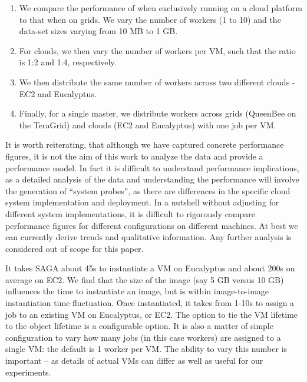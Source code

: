 \documentclass[3p,twocolumn]{elsarticle}
\begin{document}
\begin{enumerate}

 \item We compare the performance of \sagamapreduce when exclusively
 running on a cloud platform to that when on grids. We vary the number
 of workers (1 to 10) and the data-set sizes varying from 10 MB to 1 GB.

 \item For clouds, we then vary the number of workers per VM, such
 that the ratio is 1:2 and 1:4, respectively.

 \item We then distribute the same number of workers across two
 different clouds - EC2 and Eucalyptus.

 \item Finally, for a single master, we distribute workers across
 grids (QueenBee on the TeraGrid) and clouds (EC2 and Eucalyptus) with
 one job per VM.

\end{enumerate}

It is worth reiterating, that although we have captured concrete
performance figures, it is not the aim of this work to analyze the
data and provide a performance model. In fact it is difficult to
understand performance implications, as a detailed analysis of the
data and understanding the performance will involve the generation of
``system probes'', as there are differences in the specific cloud
system implementation and deployment.  In a nutshell without adjusting
for different system implementations, it is difficult to rigorously
compare performance figures for different configurations on different
machines. At best we can currently derive trends and qualitative
information.  Any further analysis is considered out of scope for this
paper.

It takes SAGA about 45s to instantiate a VM on Eucalyptus and about
200s on average on EC2.  We find that the size of the image (say 5 GB
versus 10 GB) influences the time to instantiate an image, but is
within image-to-image instantiation time fluctuation.  Once
instantiated, it takes from 1-10s to assign a job to an existing VM on
Eucalyptus, or EC2.  The option to tie the VM lifetime to the
 object lifetime is a configurable option.  It
is also a matter of simple configuration to vary how many jobs (in
this case workers) are assigned to a single VM:  the default is 1
worker per VM.  The ability to vary this number is important -- as
details of actual VMs can differ as well as useful for our
experiments.
\end{document}
